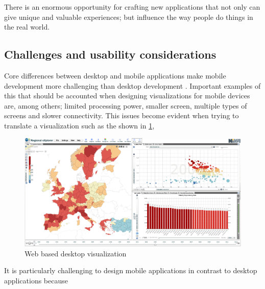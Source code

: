 There is an enormous opportunity for crafting new applications that not only can give unique and valuable experiences; but influence the way people do things in the real world. 




\subsection{Challenges and usability considerations}

Core differences between desktop and mobile applications make mobile development more challenging than desktop development \cite{Chittaro2006}. Important examples of this that should be accounted when designing visualizations for mobile devices are, among others; limited processing power, smaller screen, multiple types of screens and slower connectivity. This issues become evident when trying to translate a visualization such as the shown in \ref{fig:web_based_desktop_visualization}, 
\begin{figure}[h]
\begin{adjustbox}{width=1.2\textwidth,center=\textwidth}
  \centering
  \includegraphics[scale=.5]{images/visualization_desktop_example.png}
\end{adjustbox}
  \caption[Web-based desktop visualization]{Web based desktop visualization \cite{MarekMojzik}}
  \label{fig:web_based_desktop_visualization}
\end{figure}

It is particularly challenging to design mobile applications in contrast to desktop applications because 
